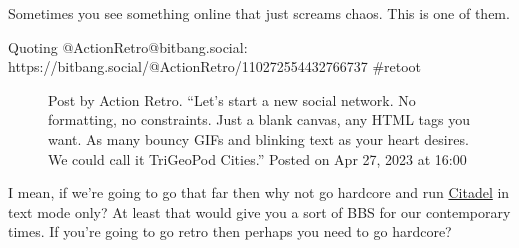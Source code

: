 Sometimes you see something online that just screams chaos. This is one
of them.

Quoting @ActionRetro@bitbang.social:
https://bitbang.social/@ActionRetro/110272554432766737 \#retoot

\begin{figure}
\centering
{}
\caption{Post by Action Retro. ``Let's start a new social network. No
formatting, no constraints. Just a blank canvas, any HTML tags you want.
As many bouncy GIFs and blinking text as your heart desires. We could
call it TriGeoPod Cities.'' Posted on Apr 27, 2023 at 16:00}
\end{figure}

I mean, if we're going to go that far then why not go hardcore and run
\href{https://www.citadel.org/}{Citadel} in text mode only? At least
that would give you a sort of BBS for our contemporary times. If you're
going to go retro then perhaps you need to go hardcore?

